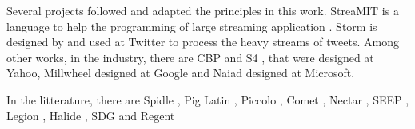 Several projects followed and adapted the principles in this work.
StreaMIT is a language to help the programming of large streaming application \cite{Thies2002}.
Storm \cite{Toshniwal2014} is designed by and used at Twitter to process the heavy streams of tweets.
Among other works, in the industry, there are
CBP \cite{Logothetis2010} and
S4 \cite{Neumeyer2010}, that were designed at Yahoo,
Millwheel \cite{Akidau2013} designed at Google and
Naiad \cite{Murray2013} designed at Microsoft.

In the litterature, there are
Spidle \cite{Consel2003},
Pig Latin \cite{Olston2008},
Piccolo \cite{Power2010},
Comet \cite{He2010},
Nectar \cite{Gunda2010},
SEEP \cite{Migliavacca2010},
Legion \cite{Bauer2012},
Halide \cite{Ragan-Kelley2013},
SDG \cite{Fernandez2014a} and
Regent \cite{Slaughter2015}








